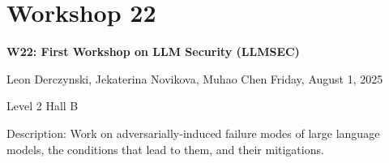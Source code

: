 \clearpage


\section[W22: First Workshop on LLM Security (LLMSEC)]{Workshop 22}
\label{workshop_22}

\begin{center}
    {\Large \textbf{W22: First Workshop on LLM Security (LLMSEC)}}

Leon Derczynski, Jekaterina Novikova, Muhao Chen
    Friday, August 1, 2025

   Level 2 Hall B
    
\end{center}

Description: Work on adversarially-induced failure modes of large language models, the conditions that lead to them, and their mitigations.

